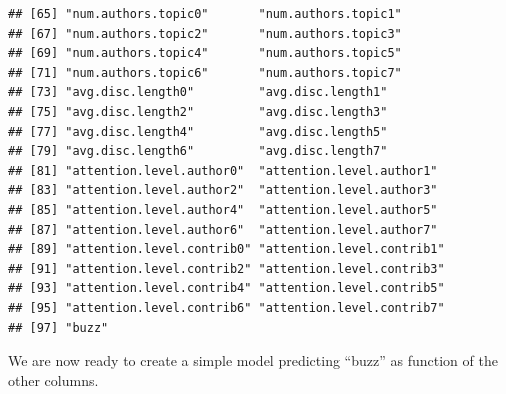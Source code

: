\documentclass{article}\usepackage[]{graphicx}\usepackage[]{color}
\makeatletter
\newenvironment{kframe}{%
 \def\at@end@of@kframe{}%
 \ifinner\ifhmode%
  \def\at@end@of@kframe{\end{minipage}}%
  \begin{minipage}{\columnwidth}%
 \fi\fi%
 \def\FrameCommand##1{\hskip\@totalleftmargin \hskip-\fboxsep
 \colorbox{shadecolor}{##1}\hskip-\fboxsep
     \hskip-\linewidth \hskip-\@totalleftmargin \hskip\columnwidth}%
 \MakeFramed {\advance\hsize-\width
   \@totalleftmargin\z@ \linewidth\hsize
   \@setminipage}}%
 {\par\unskip\endMakeFramed%
 \at@end@of@kframe}
\newenvironment{knitrout}{}{} %
\makeatother
\begin{document}
\begin{knitrout}
\begin{kframe}
\begin{verbatim}
## [65] "num.authors.topic0"       "num.authors.topic1"      
## [67] "num.authors.topic2"       "num.authors.topic3"      
## [69] "num.authors.topic4"       "num.authors.topic5"      
## [71] "num.authors.topic6"       "num.authors.topic7"      
## [73] "avg.disc.length0"         "avg.disc.length1"        
## [75] "avg.disc.length2"         "avg.disc.length3"        
## [77] "avg.disc.length4"         "avg.disc.length5"        
## [79] "avg.disc.length6"         "avg.disc.length7"        
## [81] "attention.level.author0"  "attention.level.author1" 
## [83] "attention.level.author2"  "attention.level.author3" 
## [85] "attention.level.author4"  "attention.level.author5" 
## [87] "attention.level.author6"  "attention.level.author7" 
## [89] "attention.level.contrib0" "attention.level.contrib1"
## [91] "attention.level.contrib2" "attention.level.contrib3"
## [93] "attention.level.contrib4" "attention.level.contrib5"
## [95] "attention.level.contrib6" "attention.level.contrib7"
## [97] "buzz"
\end{verbatim}
\end{kframe}
\end{knitrout}


We are now ready to create a simple model predicting ``buzz'' as function of the
other columns.
\end{document}
